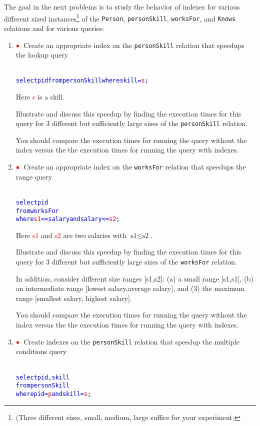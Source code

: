 \documentclass{article}
\newcommand{\redbullet}{$\textcolor{red}{\bullet}$}
\newcommand{\red}[1]{\textcolor{red}#1}
\begin{document}
\newpage
The goal in the next problems is to study the behavior of indexes for various different sized instances\footnote{(Three different sizes, small, medium, large suffice for your experiment.} of the {\tt Person}, {\tt personSkill}, {\tt worksFor}, and {\tt Knows} relations
and for various queries:
\begin{enumerate}[resume]
\item \redbullet\  Create an appropriate index on the {\tt personSkill} relation that speedups the lookup query
\begin{alltt}\textcolor{blue}{
select pid from personSkill where skill = \red{s};}
\end{alltt}
Here \textcolor{red}{s} is a skill.

Illustrate and discuss this speedup by finding the execution times for this query for 3 different
but sufficiently large sizes of the {\tt personSkill} relation.  

You should compare the execution times for running the query without the index versus the
the execution times for running the query with indexes.

\item \redbullet\  Create an appropriate index on the {\tt worksFor} relation that speedups the range query
\begin{alltt}\textcolor{blue}{
select pid
from   worksFor
where  \textcolor{red}{s1} <= salary and salary <= \textcolor{red}{s2};}
\end{alltt}
Here \textcolor{red}{s1} and \textcolor{red}{s2} are two salaries with $\text{s1} \leq \text{s2}$.

Illustrate and discuss this speedup by finding the execution times for this query for 3 different
but sufficiently large sizes of the {\tt worksFor} relation.



In addition, consider different size ranges [s1,s2]: (a) a small range [s1,s1], (b) an intermediate range
[lowest salary,average salary], and (3)
the maximum range [smallest salary, highest salary].

You should compare the execution times for running the query without the index versus the
the execution times for running the query with indexes.

\item \redbullet\  Create indexes on the {\tt personSkill} relation that speedup the multiple conditions query
\begin{alltt}\textcolor{blue}{
select pid, skill
from   personSkill
where  pid = \red{p} and skill = \red{s};}
\end{alltt}


\end{enumerate}
\end{document}
